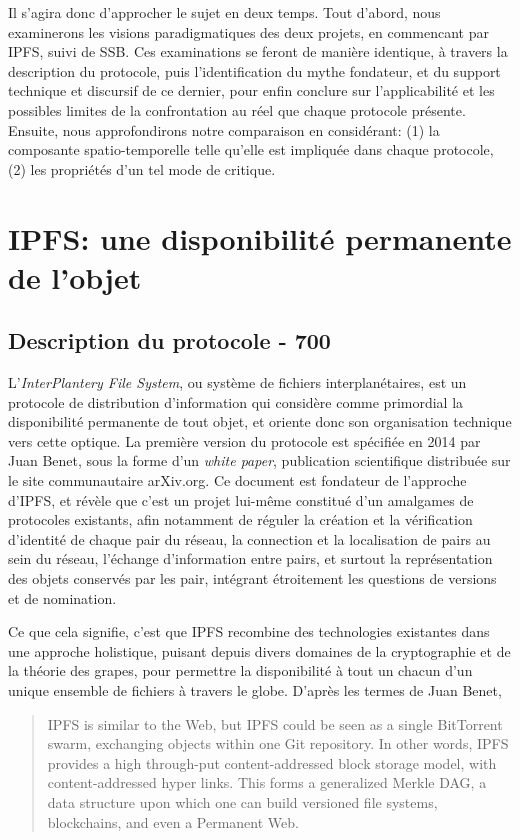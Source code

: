 \documentclass{article}
\begin{document}
Il s'agira donc d'approcher le sujet en deux temps. Tout d'abord, nous examinerons les visions paradigmatiques des deux projets, en commencant par IPFS, suivi de SSB. Ces examinations se feront de manière identique, à travers la description du protocole, puis l'identification du mythe fondateur, et du support technique et discursif de ce dernier, pour enfin conclure sur l'applicabilité et les possibles limites de la confrontation au réel que chaque protocole présente. Ensuite, nous approfondirons notre comparaison en considérant: (1) la composante spatio-temporelle telle qu'elle est impliquée dans chaque protocole, (2) les propriétés d'un tel mode de critique.

\section{IPFS: une disponibilité permanente de l'objet}

\subsection{Description du protocole - 700}

L'\emph{InterPlantery File System}, ou système de fichiers interplanétaires, est un protocole de distribution d'information qui considère comme primordial la disponibilité permanente de tout objet, et oriente donc son organisation technique vers cette optique. La première version du protocole est spécifiée en 2014 par Juan Benet, sous la forme d'un \emph{white paper}, publication scientifique distribuée sur le site communautaire arXiv.org. Ce document est fondateur de l'approche d'IPFS, et révèle que c'est un projet lui-même constitué d'un amalgames de protocoles existants, afin notamment de réguler la création et la vérification d'identité de chaque pair du réseau, la connection et la localisation de pairs au sein du réseau, l'échange d'information entre pairs, et surtout la représentation des objets conservés par les pair, intégrant étroitement les questions de versions et de nomination.

Ce que cela signifie, c'est que IPFS recombine des technologies existantes dans une approche holistique, puisant depuis divers domaines de la cryptographie et de la théorie des grapes, pour permettre la disponibilité à tout un chacun d'un unique ensemble de fichiers à travers le globe. D'après les termes de Juan Benet,

\begin{quote}
    IPFS is similar to the Web, but IPFS could be seen as a single BitTorrent swarm, exchanging objects within one Git repository. In other words, IPFS provides a high through-put content-addressed block storage model, with content-addressed hyper links. This forms a generalized Merkle DAG, a data structure upon which one can build versioned file systems, blockchains, and even a Permanent Web.
\end{quote}
\end{document}
